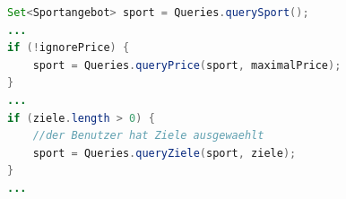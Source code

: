 \begin{lstlisting}[float=htbp, caption=Filtern von Sportarten, label=lst:filtern, language=JAVA]
Set<Sportangebot> sport = Queries.querySport();
...        
if (!ignorePrice) {
	sport = Queries.queryPrice(sport, maximalPrice);
}
...
if (ziele.length > 0) {
	//der Benutzer hat Ziele ausgewaehlt
	sport = Queries.queryZiele(sport, ziele);
}
...                
\end{lstlisting}
